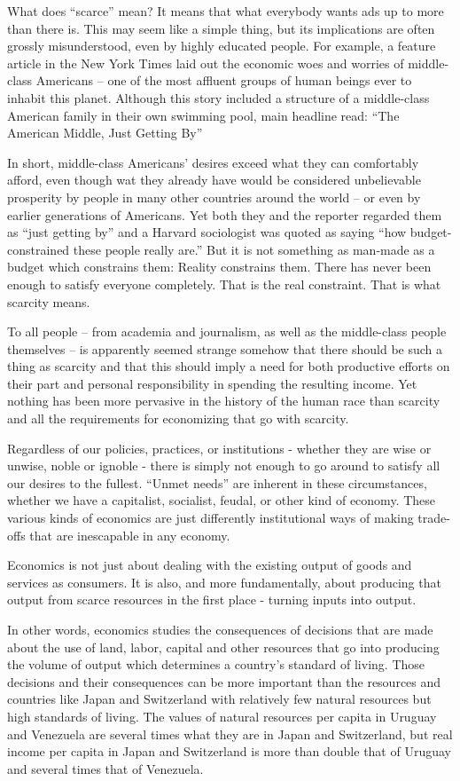What does ``scarce'' mean?  It means that what everybody wants ads up to more than there is. This may seem like a simple thing, but its implications are often grossly misunderstood, even by highly educated people. For example, a feature article in the New York Times laid out the economic woes and worries of middle-class Americans – one of the most affluent groups of human beings ever to inhabit this planet. Although this story included a structure of a middle-class American family in their own swimming pool, main headline read: ``The American Middle, Just Getting By''

In short, middle-class Americans’ desires exceed what they can comfortably afford, even though wat they already have would be considered unbelievable prosperity by people in many other countries around the world – or even by earlier generations of Americans. Yet both they and the reporter regarded them as “just getting by” and a Harvard sociologist was quoted as saying “how budget-constrained these people really are.”  But it is not something as man-made as a budget which constrains them: Reality constrains them. There has never been enough to satisfy everyone completely. That is the real constraint. That is what scarcity means.

To all people – from academia and journalism, as well as the middle-class people themselves – is apparently seemed strange somehow that there should be such a thing as scarcity and that this should imply a need for both productive efforts on their part and personal responsibility in spending the resulting income. Yet nothing has been more pervasive in the history of the human race than scarcity and all the requirements for economizing that go with scarcity.

Regardless of our policies, practices, or institutions - whether they are wise or unwise, noble or ignoble - there is simply not enough to go around to satisfy all our desires to the fullest. ``Unmet needs'' are inherent in these circumstances, whether we have a capitalist, socialist, feudal, or other kind of economy. These various kinds of economics are just differently institutional ways of making trade-offs that are inescapable in any economy.

Economics is not just about dealing with the existing output of goods and services as consumers. It is also, and more fundamentally, about producing that output from scarce resources in the first place - turning inputs into output.

In other words, economics studies the consequences of decisions that are made about the use of land, labor, capital and other resources that go into producing the volume of output which determines a country’s standard of living. Those decisions and their consequences can be more important than the resources and countries like Japan and Switzerland with relatively few natural resources but high standards of living. The values of natural resources per capita in Uruguay and Venezuela are several times what they are in Japan and Switzerland, but real income per capita in Japan and Switzerland is more than double that of Uruguay and several times that of Venezuela.

